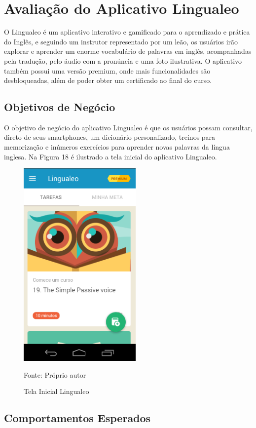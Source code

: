 \documentclass[
	12pt,				%
	openany,			%
	oneside,			%
	a4paper,			%
	english,			%
	french,				%
	spanish,			%
	brazil				%
	]{abntex2}
\begin{document}
\section{Avaliação do Aplicativo Lingualeo}
O Lingualeo é um aplicativo interativo e gamificado para o aprendizado e prática do Inglês, e seguindo um instrutor representado por um leão, os usuários irão explorar e aprender um enorme vocabulário de palavras em inglês, acompanhadas pela tradução, pelo áudio com a pronúncia e uma foto ilustrativa. O aplicativo também possui uma versão premium, onde mais funcionalidades são desbloqueadas, além de poder obter um certificado ao final do curso.

\subsection{Objetivos de Negócio}
O objetivo de negócio do aplicativo Lingualeo é que os usuários possam consultar, direto de seus smartphones, um dicionário personalizado, treinos para memorização e inúmeros exercícios para aprender novas palavras da língua inglesa.
Na Figura 18 é ilustrado a tela inicial do aplicativo Lingualeo.

\begin{figure}[H]
    \centering
\caption{Tela Inicial Lingualeo}
\includegraphics[width=6cm]{figuras/iniciallingualeo.png}
\par
 Fonte: Próprio autor
\end{figure}

\subsection{Comportamentos Esperados}
\end{document}
